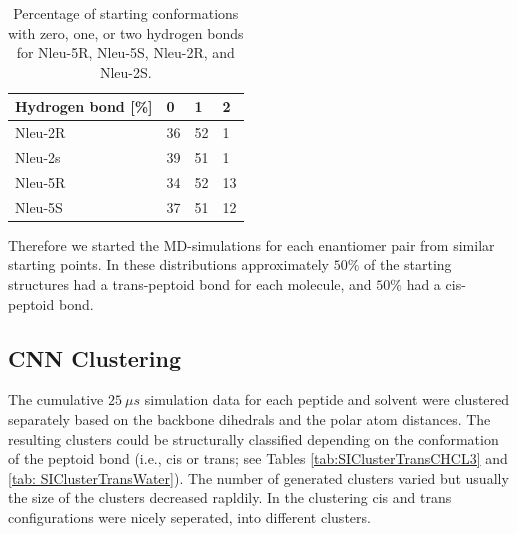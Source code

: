 \begin{table}[h!]
\centering
\caption{ Percentage of starting conformations with zero, one, or two hydrogen bonds for
Nleu-5R, Nleu-5S, Nleu-2R, and Nleu-2S.}
\label{tab: SIhbondAmountRatios}
  \begin{adjustbox}{max width=\textwidth}
\begin{tabular}{llll}
Hydrogen bond {[}\%{]} & 0      & 1          & 2        \\
    \hline
Nleu-2R        & 36             & 52         &  1       \\
Nleu-2s        & 39             & 51         &  1       \\
Nleu-5R        & 34             & 52         &  13      \\
Nleu-5S        & 37             & 51         &  12  \\
   \hline

\end{tabular}%
\end{adjustbox}
\end{table}

Therefore we started the MD-simulations for each enantiomer pair from similar starting points.
In these distributions approximately $50\%$ of the starting structures had a trans-peptoid bond for each molecule, and $50\%$ had a cis-peptoid bond.

\FloatBarrier

\subsection{CNN Clustering} 
The cumulative $25~\mu s$ simulation data for each peptide and solvent were clustered separately based on the backbone dihedrals and the polar atom distances. The resulting clusters could be structurally classified depending on the conformation of the peptoid bond (i.e., cis or trans; see Tables \ref{tab:SIClusterTransCHCL3} and \ref{tab: SIClusterTransWater}). The number of generated clusters varied but usually the size of the clusters decreased rapldily. In the clustering cis and trans configurations were nicely seperated, into different clusters.

